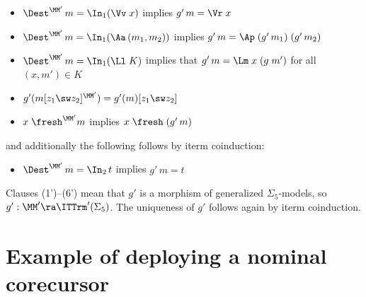 \begin{itemize}
	\item[(1')] $\Dest^{\MM'}\,m = \In_1(\Vv\;x)$ implies $g'\,m = \Vr\;x$ 
	\item[(2')] $\Dest^{\MM'}\,m = \In_1(\Aa\,(m_1,m_2))$ implies $g'\,m = \Ap\;(g'\,m_1)\;(g'\,m_2)$
	\item[(3')] $\Dest^{\MM'}\,m = \In_1(\Ll\;K)$ implies that $g'\,m = \Lm\;x\;(g\;m')$ for all $(x,m') \in K$
	\item[(4')] $g'(m[z_1 \sw z_2]^{\MM'}) = g'(m)[z_1 \sw z_2]$
	\item[(5')] $x\;\fresh^{\MM'} m$ implies $x\;\fresh\;(g'\,m)$
\end{itemize}
and additionally the following follows by iterm coinduction:
\begin{itemize}
	\item[(6')] $\Dest^{\MM'}\,m = \In_2\,t$ implies $g'\,m = t$ 
\end{itemize} 
%
Clauses (1')--(6') mean that $g'$ is a morphism of generalized $\Sigma_5$-models, so $g' : \MM' \ra \ITTrm'(\Sigma_5)$.  The uniqueness of $g'$ follows again by iterm coinduction. 
 






\section{Example of deploying a nominal corecursor} 
\label{app-exaCorec}

